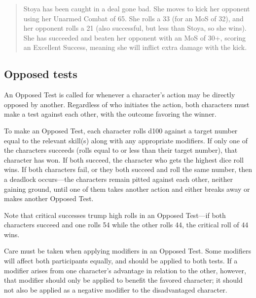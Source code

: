 \begin{quotation}
  Stoya has been caught in a deal gone bad. She moves to kick her
  opponent using her Unarmed Combat of 65. She rolls a 33 (for an MoS
  of 32), and her opponent rolls a 21 (also successful, but less than
  Stoya, so she wins). She has succeeded and beaten her opponent with
  an MoS of 30+, scoring an Excellent Success, meaning she will
  inflict extra damage with the kick.
\end{quotation}

\subsection{Opposed tests}
\label{sec:opposed-tests}

An Opposed Test is called for whenever a character's action may be
directly opposed by another. Regardless of who initiates the action,
both characters must make a test against each other, with the outcome
favoring the winner.

To make an Opposed Test, each character rolls d100 against a target
number equal to the relevant skill(s) along with any appropriate
modifiers. If only one of the characters succeeds (rolls equal to or
less than their target number), that character has won.  If both
succeed, the character who gets the highest dice roll wins. If both
characters fail, or they both succeed and roll the same number, then a
deadlock occurs—the characters remain pitted against each other,
neither gaining ground, until one of them takes another action and
either breaks away or makes another Opposed Test.

Note that critical successes trump high rolls in an Opposed Test—if
both characters succeed and one rolls 54 while the other rolls 44, the
critical roll of 44 wins.

Care must be taken when applying modifiers in an Opposed Test. Some
modifiers will affect both participants equally, and should be applied
to both tests. If a modifier arises from one character's advantage in
relation to the other, however, that modifier should only be applied
to benefit the favored character; it should not also be applied as a
negative modifier to the disadvantaged character.

